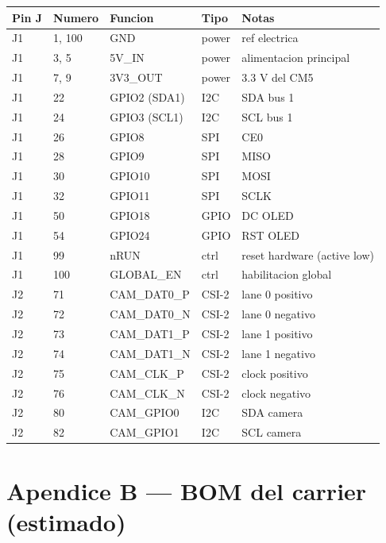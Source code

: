 \documentclass[11pt,a4paper,oneside,openright]{book}
\begin{document}
\begin{center}
\small
\begin{longtable}{lllll}
\toprule
\textbf{Pin J} & \textbf{Numero} & \textbf{Funcion} & \textbf{Tipo} & \textbf{Notas} \\
\midrule
\endhead
J1 & 1, 100      & GND            & power & ref electrica \\
J1 & 3, 5        & 5V\_IN         & power & alimentacion principal \\
J1 & 7, 9        & 3V3\_OUT       & power & 3.3 V del CM5 \\
J1 & 22          & GPIO2 (SDA1)   & I2C   & SDA bus 1 \\
J1 & 24          & GPIO3 (SCL1)   & I2C   & SCL bus 1 \\
J1 & 26          & GPIO8          & SPI   & CE0 \\
J1 & 28          & GPIO9          & SPI   & MISO \\
J1 & 30          & GPIO10         & SPI   & MOSI \\
J1 & 32          & GPIO11         & SPI   & SCLK \\
J1 & 50          & GPIO18         & GPIO  & DC OLED \\
J1 & 54          & GPIO24         & GPIO  & RST OLED \\
J1 & 99          & nRUN           & ctrl  & reset hardware (active low) \\
J1 & 100         & GLOBAL\_EN     & ctrl  & habilitacion global \\
J2 & 71          & CAM\_DAT0\_P   & CSI-2 & lane 0 positivo \\
J2 & 72          & CAM\_DAT0\_N   & CSI-2 & lane 0 negativo \\
J2 & 73          & CAM\_DAT1\_P   & CSI-2 & lane 1 positivo \\
J2 & 74          & CAM\_DAT1\_N   & CSI-2 & lane 1 negativo \\
J2 & 75          & CAM\_CLK\_P    & CSI-2 & clock positivo \\
J2 & 76          & CAM\_CLK\_N    & CSI-2 & clock negativo \\
J2 & 80          & CAM\_GPIO0     & I2C   & SDA camera \\
J2 & 82          & CAM\_GPIO1     & I2C   & SCL camera \\
\bottomrule
\end{longtable}
\end{center}

\chapter{Apendice B --- BOM del carrier (estimado)}
\end{document}
